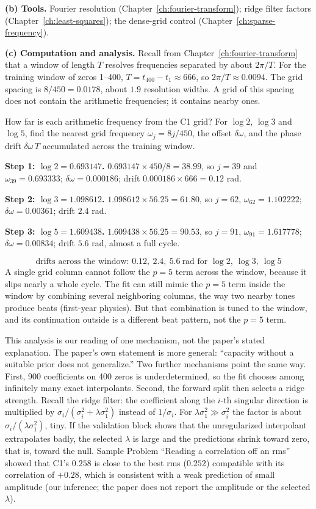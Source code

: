 \textbf{(b) Tools.} Fourier resolution (Chapter~\ref{ch:fourier-transform}); ridge filter factors (Chapter~\ref{ch:least-squares}); the dense-grid control (Chapter~\ref{ch:sparse-frequency}).

\textbf{(c) Computation and analysis.} Recall from Chapter~\ref{ch:fourier-transform} that a window of length $T$ resolves frequencies separated by about $2\pi/T$. For the training window of zeros 1--400, $T=t_{400}-t_1\approx666$, so $2\pi/T\approx0.0094$. The grid spacing is $8/450=0.0178$, about $1.9$ resolution widths. A grid of this spacing does not contain the arithmetic frequencies; it contains nearby ones.

\begin{sample}{How far is each arithmetic frequency from the C1 grid?}
For $\log2$, $\log3$ and $\log5$, find the nearest grid frequency $\omega_j=8j/450$, the offset $\delta\omega$, and the phase drift $\delta\omega\,T$ accumulated across the training window.

\textbf{Step 1: $\log 2=0.693147$.} $0.693147\times450/8=38.99$, so $j=39$ and $\omega_{39}=0.693333$; $\delta\omega=0.000186$; drift $0.000186\times666=0.12$ rad.

\textbf{Step 2: $\log3=1.098612$.} $1.098612\times56.25=61.80$, so $j=62$, $\omega_{62}=1.102222$; $\delta\omega=0.00361$; drift $2.4$ rad.

\textbf{Step 3: $\log5=1.609438$.} $1.609438\times56.25=90.53$, so $j=91$, $\omega_{91}=1.617778$; $\delta\omega=0.00834$; drift $5.6$ rad, almost a full cycle.

\[
\boxed{\text{drifts across the window: } 0.12,\ 2.4,\ 5.6\ \text{rad for } \log2,\ \log3,\ \log5}
\]
A single grid column cannot follow the $p=5$ term across the window, because it slips nearly a whole cycle. The fit can still mimic the $p=5$ term inside the window by combining several neighboring columns, the way two nearby tones produce beats (first-year physics). But that combination is tuned to the window, and its continuation outside is a different beat pattern, not the $p=5$ term.
\end{sample}

This analysis is our reading of one mechanism, not the paper's stated explanation. The paper's own statement is more general: ``capacity without a suitable prior does not generalize.'' Two further mechanisms point the same way. First, 900 coefficients on 400 zeros is underdetermined, so the fit chooses among infinitely many exact interpolants. Second, the forward split then selects a ridge strength. Recall the ridge filter: the coefficient along the $i$-th singular direction is multiplied by $\sigma_i/(\sigma_i^2+\lambda\sigma_1^2)$ instead of $1/\sigma_i$. For $\lambda\sigma_1^2\gg\sigma_i^2$ the factor is about $\sigma_i/(\lambda\sigma_1^2)$, tiny. If the validation block shows that the unregularized interpolant extrapolates badly, the selected $\lambda$ is large and the predictions shrink toward zero, that is, toward the null. Sample Problem ``Reading a correlation off an rms'' showed that C1's $0.258$ is close to the best rms ($0.252$) compatible with its correlation of $+0.28$, which is consistent with a weak prediction of small amplitude (our inference; the paper does not report the amplitude or the selected $\lambda$).

